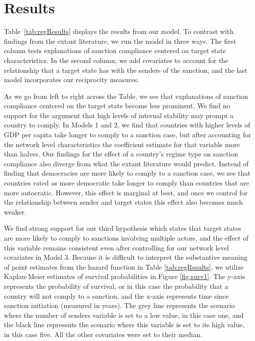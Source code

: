 \section*{Results}
\label{Results} 


Table~\ref{tab:regResults} displays the results from our model. To contrast with findings from the extant literature, we run the model in three ways. The first column tests explanations of sanction compliance centered on target state characteristics. In the second column, we add covariates to account for the relationship that a target state has with the senders of the sanction, and the last model incorporates our reciprocity measures. 

As we go from left to right across the Table, we see that explanations of sanction compliance centered on the target state become less prominent. We find no support for the argument that high levels of internal stability may prompt a country to comply. In Models 1 and 2, we find that countries with higher levels of GDP per capita take longer to comply to a sanction case, but after accounting for the network level characteristics the coefficient estimate for that variable more than halves. Our findings for the effect of a country's regime type on sanction compliance also diverge from what the extant literature would predict. Instead of finding that democracies are more likely to comply to a sanction case, we see that countries rated as more democratic take longer to comply than countries that are more autocratic. However, this effect is marginal at best, and once we control for the relationship between sender and target states this effect also becomes much weaker. 

\newpage

\newpage

We find strong support for our third hypothesis which states that target states are more likely to comply to sanctions involving multiple actors, and the effect of this variable remains consistent even after controlling for our network level covariates in Model 3. Because it is difficult to interpret the substantive meaning of point estimates from the hazard function in Table \ref{tab:regResults}, we utilize Kaplan-Meier estimates of survival probabilities in Figure \ref{fig:surv1}. The y-axis represents the probability of survival, or in this case the probability that a country will not comply to a sanction, and the x-axis represents time since sanction initiation (measured in years). The grey line represents the scenario where the number of senders variable is set to a low value, in this case one, and the black line represents the scenario where this variable is set to its high value, in this case five. All the other covariates were set to their median. 

